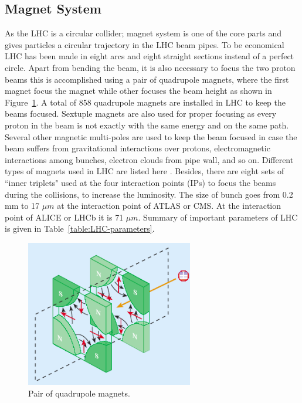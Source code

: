 \subsection{Magnet System}
As the LHC is a circular collider; magnet system is one of the core parts and gives particles a circular trajectory in the LHC beam pipes. To be economical LHC has been made in eight arcs and eight straight sections instead of a perfect circle. Apart from bending the beam, it is also necessary to focus the two proton beams this is accomplished using a pair of quadrupole magnets, where the first magnet focus the magnet while other focuses the beam height as shown in Figure~\ref{fig:QuadrupoleMagnet}. A total of 858 quadrupole magnets are installed in LHC to keep the beams focused. Sextuple magnets are also used for proper focusing as every proton in the beam is not exactly with the same energy and on the same path. Several other magnetic multi-poles are used to keep the beam focused  in case the beam suffers from gravitational interactions over protons, electromagnetic interactions among bunches, electron clouds from pipe wall, and so on. Different types of magnets used in LHC are listed here \cite{WebLink:LHC_magnets}. Besides, there are eight sets of ``inner triplets" used at the four interaction points (IPs) to focus the beams during the collisions, to increase the luminosity. The size of bunch goes from 0.2 mm to 17 $\mu m$ at the interaction point of ATLAS or CMS. At the interaction point of ALICE or LHCb it is 71 $\mu m$. Summary of important parameters of LHC is given in Table~\ref{table:LHC-parameters}.
\begin{figure}[!htbp]
	\centering
	\includegraphics[width=0.65\textwidth]{figures/LHC/quadrupole_magnet_pair.png}
	\caption{Pair of quadrupole magnets.}
	\label{fig:QuadrupoleMagnet}
\end{figure}




